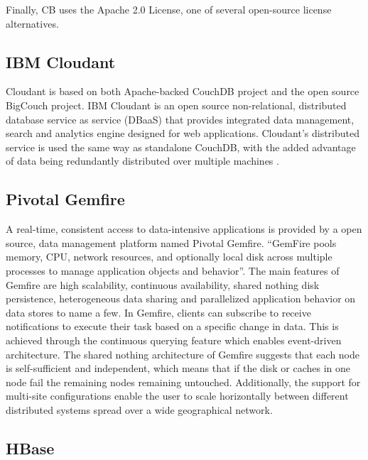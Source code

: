      Finally, CB uses the Apache 2.0 License, one of several
     open-source license alternatives. \cite{www-quora-cbs}

\subsection{ IBM Cloudant}
     
     Cloudant is based on both Apache-backed CouchDB project and the
     open source BigCouch project. IBM Cloudant is an open source
     non-relational, distributed database service as service (DBaaS)
     that provides integrated data management, search and analytics 
     engine designed for web applications. Cloudant's distributed
     service is used the same way as standalone CouchDB, with the
     added advantage of data being redundantly distributed over
     multiple machines \cite{www-ibm-cloudant}.
   

\subsection{ Pivotal Gemfire \cite{www-gemfire}}
     
     A real-time, consistent access to data-intensive applications is
     provided by a open source, data management platform named Pivotal
     Gemfire. ``GemFire pools memory, CPU, network resources, and
     optionally local disk across multiple processes to manage
     application objects and behavior''. The main features of Gemfire
     are high scalability, continuous availability, shared nothing
     disk persistence, heterogeneous data sharing and parallelized
     application behavior on data stores to name a few.  In Gemfire,
     clients can subscribe to receive notifications to execute their
     task based on a specific change in data. This is achieved through
     the continuous querying feature which enables event-driven
     architecture. The shared nothing architecture of Gemfire suggests
     that each node is self-sufficient and independent, which means
     that if the disk or caches in one node fail the remaining nodes
     remaining untouched. Additionally, the support for multi-site
     configurations enable the user to scale horizontally between
     different distributed systems spread over a wide geographical
     network.
     
\subsection{ HBase}

